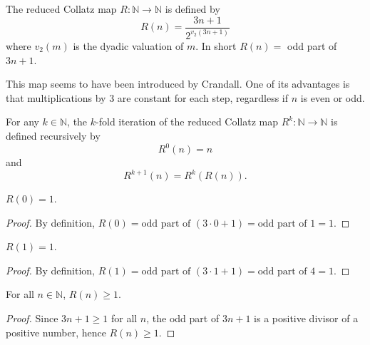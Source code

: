 \begin{definition}\label{def:reduced_collatz_step}\leanok
The reduced Collatz map $R: \mathbb{N}\to \mathbb{N}$ is defined by
\begin{equation}
    R(n) = \frac{3n+1}{2^{v_2(3n+1)}}
\end{equation}
where $v_2(m)$ is the dyadic valuation of $m$. In short $R(n)=$ odd part of $3n+1$.
\end{definition}
This map seems to have been introduced by Crandall\cite{crandall78}. One of its advantages is
that multiplications by 3 are constant for each step, regardless if $n$ is even or odd.

\begin{definition}\label{def:R_iter}\leanok
For any $k \in \mathbb{N}$, the $k$-fold iteration of the reduced Collatz map
$R^k: \mathbb{N} \to \mathbb{N}$ is defined recursively by
\begin{equation}
    R^0(n) = n
\end{equation}
and
\begin{equation}
    R^{k+1}(n) = R^k(R(n)).
\end{equation}
\end{definition}

\begin{lemma}\label{lemma:R_zero}\leanok
$R(0) = 1$.
\end{lemma}
\begin{proof}\leanok
By definition, $R(0) = \text{odd part of } (3 \cdot 0 + 1) = \text{odd part of } 1 = 1$.
\end{proof}

\begin{lemma}\label{lemma:R_one}\leanok
$R(1) = 1$.
\end{lemma}
\begin{proof}\leanok
By definition, $R(1) = \text{odd part of } (3 \cdot 1 + 1) = \text{odd part of } 4 = 1$.
\end{proof}

\begin{lemma}\label{lemma:reduced_collatz_step_pos}\leanok
For all $n \in \mathbb{N}$, $R(n) \geq 1$.
\end{lemma}
\begin{proof}\leanok
Since $3n + 1 \geq 1$ for all $n$, the odd part of $3n+1$ is a positive divisor of a positive number, hence $R(n) \geq 1$.
\end{proof}

